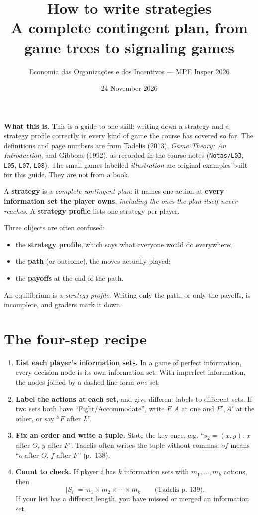 \documentclass[11pt,a4paper]{article}
\title{How to write strategies\\[2pt]\large A complete contingent plan, from game trees to signaling games}
\author{Economia das Organizações e dos Incentivos --- MPE Insper 2026}
\date{24 November 2026}
\begin{document}
\maketitle

\noindent\textbf{What this is.} This is a guide to one skill: writing down a strategy and a
strategy profile correctly in every kind of game the course has covered so far. The definitions
and page numbers are from Tadelis (2013), \emph{Game Theory: An Introduction}, and Gibbons (1992),
as recorded in the course notes (\texttt{Notas/L03}, \texttt{L05}, \texttt{L07}, \texttt{L08}).
The small games labelled \emph{illustration} are original examples built for this guide. They
are not from a book.

\begin{rulebox}
A \textbf{strategy} is a \emph{complete contingent plan}: it names one action at
\textbf{every information set the player owns}, \emph{including the ones the plan itself never
reaches}. A \textbf{strategy profile} lists one strategy per player.
\end{rulebox}

\noindent Three objects are often confused:
\begin{itemize}
\item the \textbf{strategy profile}, which says what everyone would do everywhere;
\item the \textbf{path} (or outcome), the moves actually played;
\item the \textbf{payoffs} at the end of the path.
\end{itemize}
An equilibrium is a \emph{strategy profile}. Writing only the path, or only the payoffs, is
incomplete, and graders mark it down.

\section{The four-step recipe}

\begin{enumerate}[label=\textbf{Step \arabic*.},leftmargin=4.2em]
\item \textbf{List each player's information sets.} In a game of perfect information, every
decision node is its own information set. With imperfect information, the nodes joined by a dashed
line form \emph{one} set.
\item \textbf{Label the actions at each set,} and give different labels to different sets. If two
sets both have ``Fight/Accommodate'', write $F, A$ at one and $F', A'$ at the other, or say ``$F$
after $L$''.
\item \textbf{Fix an order and write a tuple.} State the key once, e.g. ``$s_2=(x,y)$: $x$ after
$O$, $y$ after $F$''. Tadelis often writes the tuple without commas: $of$ means ``$o$ after $O$,
$f$ after $F$'' (p.~138).
\item \textbf{Count to check.} If player $i$ has $k$ information sets with $m_1,\dots,m_k$
actions, then
\[
|S_i| = m_1\times m_2\times\cdots\times m_k \qquad\text{(Tadelis p.~139).}
\]
If your list has a different length, you have missed or merged an information set.
\end{enumerate}
\end{document}
